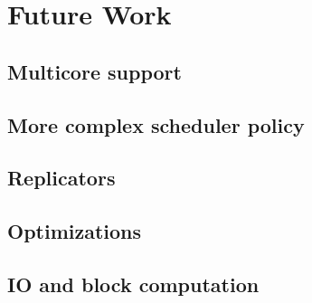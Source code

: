 
\chapter{Future Work}
\label{ch:future_work}



\section{Multicore support}
\section{More complex scheduler policy}
\section{Replicators}
\section{Optimizations}
\section{IO and block computation}

